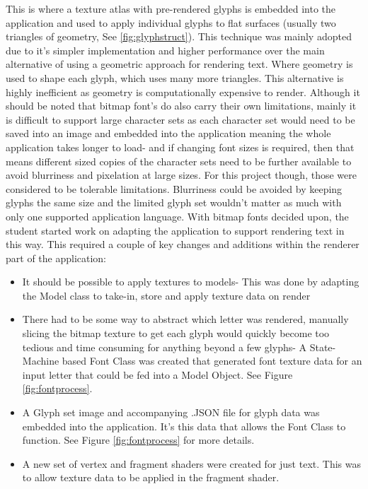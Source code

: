 This is where a texture atlas with pre-rendered glyphs is embedded into the application and used to apply individual glyphs to flat surfaces (usually two triangles of geometry, See \ref{fig:glyphstruct}). This technique was mainly adopted due to it's simpler implementation and higher performance over the main alternative of using a geometric approach for rendering text. Where geometry is used to shape each glyph, which uses many more triangles. This alternative is highly inefficient as geometry is computationally expensive to render. Although it should be noted that bitmap font's do also carry their own limitations, mainly it is difficult to support large character sets as each character set would need to be saved into an image and embedded into the application meaning the whole application takes longer to load- and if changing font sizes is required, then that means different sized copies of the character sets need to be further available to avoid blurriness and pixelation at large sizes.
For this project though, those were considered to be tolerable limitations. Blurriness could be avoided by keeping glyphs the same size and the limited glyph set wouldn't matter as much with only one supported application language.
With bitmap fonts decided upon, the student started work on adapting the application to support rendering text in this way. This required a couple of key changes and additions within the renderer part of the application:
\begin{itemize}
    \item It should be possible to apply textures to models- This was done by adapting the Model class to take-in, store and apply texture data on render
    \item There had to be some way to abstract which letter was rendered, manually slicing the bitmap texture to get each glyph would quickly become too tedious and time consuming for anything beyond a few glyphs- A State-Machine based Font Class was created that generated font texture data for an input letter that could be fed into a Model Object. See Figure \ref{fig:fontprocess}.
    \item A Glyph set image and accompanying .JSON file for glyph data was embedded into the application. It's this data that allows the Font Class to function. See Figure \ref{fig:fontprocess} for more details.
    \item A new set of vertex and fragment shaders were created for just text. This was to allow texture data to be applied in the fragment shader.
\end{itemize}

